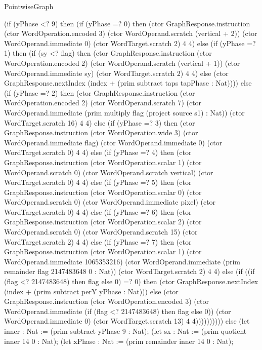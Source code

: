 \begin{lexlean}{PointwiseGraph}
\begin{semanticmodule}
{      (if (yPhase <? 9) then (if (yPhase =? 0) then (ctor GraphResponse.instruction (ctor WordOperation.encoded 3) (ctor WordOperand.scratch (vertical + 2)) (ctor WordOperand.immediate 0) (ctor WordTarget.scratch 2) 4 4) else (if (yPhase =? 1) then (if (sy <? flag) then (ctor GraphResponse.instruction (ctor WordOperation.encoded 2) (ctor WordOperand.scratch (vertical + 1)) (ctor WordOperand.immediate sy) (ctor WordTarget.scratch 2) 4 4) else (ctor GraphResponse.nextIndex (index + (prim subtract taps tapPhase : Nat)))) else (if (yPhase =? 2) then (ctor GraphResponse.instruction (ctor WordOperation.encoded 2) (ctor WordOperand.scratch 7) (ctor WordOperand.immediate (prim multiply flag (project source s1) : Nat)) (ctor WordTarget.scratch 16) 4 4) else (if (yPhase =? 3) then (ctor GraphResponse.instruction (ctor WordOperation.wide 3) (ctor WordOperand.immediate flag) (ctor WordOperand.immediate 0) (ctor WordTarget.scratch 0) 4 4) else (if (yPhase =? 4) then (ctor GraphResponse.instruction (ctor WordOperation.scalar 1) (ctor WordOperand.scratch 0) (ctor WordOperand.scratch vertical) (ctor WordTarget.scratch 0) 4 4) else (if (yPhase =? 5) then (ctor GraphResponse.instruction (ctor WordOperation.scalar 0) (ctor WordOperand.scratch 0) (ctor WordOperand.immediate pixel) (ctor WordTarget.scratch 0) 4 4) else (if (yPhase =? 6) then (ctor GraphResponse.instruction (ctor WordOperation.scalar 2) (ctor WordOperand.scratch 0) (ctor WordOperand.scratch 15) (ctor WordTarget.scratch 2) 4 4) else (if (yPhase =? 7) then (ctor GraphResponse.instruction (ctor WordOperation.scalar 1) (ctor WordOperand.immediate 1065353216) (ctor WordOperand.immediate (prim remainder flag 2147483648 0 : Nat)) (ctor WordTarget.scratch 2) 4 4) else (if ((if (flag <? 2147483648) then flag else 0) =? 0) then (ctor GraphResponse.nextIndex (index + (prim subtract perY yPhase : Nat))) else (ctor GraphResponse.instruction (ctor WordOperation.encoded 3) (ctor WordOperand.immediate (if (flag <? 2147483648) then flag else 0)) (ctor WordOperand.immediate 0) (ctor WordTarget.scratch 13) 4 4)))))))))) else (let inner : Nat := (prim subtract yPhase 9 : Nat);
      (let sx : Nat := (prim quotient inner 14 0 : Nat);
      (let xPhase : Nat := (prim remainder inner 14 0 : Nat);
}
\end{semanticmodule}
\end{lexlean}
